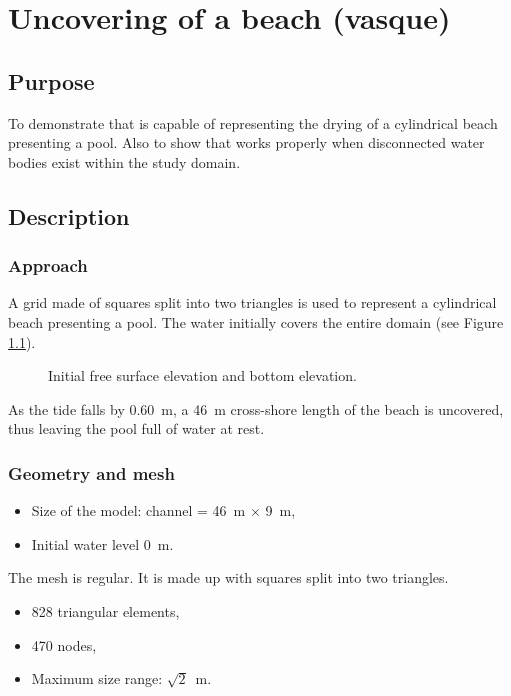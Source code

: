 \chapter{Uncovering of a beach (vasque)}
\section{Purpose}
To demonstrate that  is capable of representing the drying of a
cylindrical beach presenting a pool.
Also to show that  works properly when disconnected water bodies exist
within the study domain.

\section{Description}
\subsection{Approach}
A grid made of squares split into two triangles is used to represent a
cylindrical beach presenting a pool.
The water initially covers the entire domain (see Figure \ref{fig:vasque:FSinit}).

\begin{figure}[H]
 \centering
  \caption{Initial free surface elevation and bottom elevation.}\label{fig:vasque:FSinit}
\end{figure}

As the tide falls by 0.60~m, a 46~m cross-shore length of the beach is
uncovered, thus leaving the pool full of water at rest.

\subsection{Geometry and mesh}
\begin{itemize}
\item Size of the model: channel = 46~m $\times$ 9~m,
\item Initial water level 0~m.
\end{itemize}

The mesh is regular. It is made up with squares split into two triangles.
\begin{itemize}
\item 828 triangular elements,
\item 470 nodes,
\item Maximum size range: $\sqrt{2}$~m.
\end{itemize}

